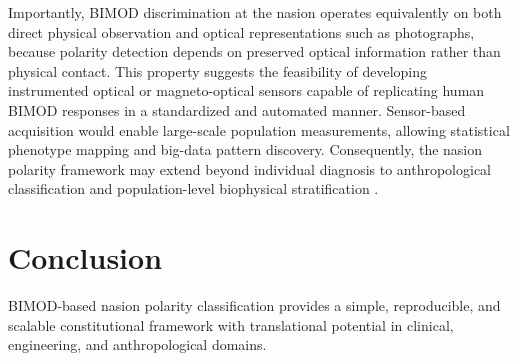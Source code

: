\documentclass[11pt,a4paper]{article}
\begin{document}
Importantly, BIMOD discrimination at the nasion operates equivalently on both direct physical
observation and optical representations such as photographs, because polarity detection depends
on preserved optical information rather than physical contact. This property suggests the
feasibility of developing instrumented optical or magneto-optical sensors capable of replicating
human BIMOD responses in a standardized and automated manner. Sensor-based acquisition would
enable large-scale population measurements, allowing statistical phenotype mapping and
big-data pattern discovery. Consequently, the nasion polarity framework may extend beyond
individual diagnosis to anthropological classification and population-level biophysical
stratification \cite{white2011human_osteology}.

\section{Conclusion}

BIMOD-based nasion polarity classification provides a simple, reproducible, and scalable
constitutional framework with translational potential in clinical, engineering, and
anthropological domains.



\end{document}
